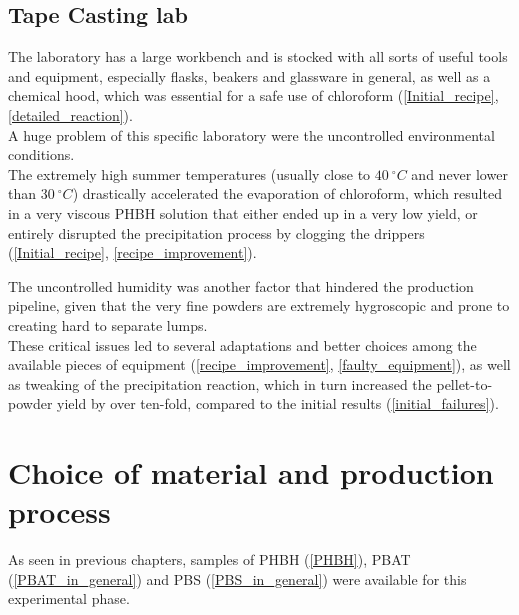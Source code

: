 \documentclass{article}
\begin{document}
        \subsection{Tape Casting lab\label{Tape_casting}}

        The laboratory has a large workbench and is stocked with all sorts of useful tools and equipment, especially flasks,
        beakers and glassware 
        in general, as well as a chemical hood, which was essential for a safe use of chloroform 
        (\ref{Initial_recipe}, \ref{detailed_reaction}). \\ 

        A huge problem of this specific laboratory were the uncontrolled environmental conditions. \\

        The extremely high summer temperatures (usually close to $40 \ ^{\circ} C$ and never lower than 
        $30 \ ^{\circ} C$) drastically accelerated the evaporation of chloroform, which resulted in a 
        very viscous PHBH solution that either ended up in a very low yield, or entirely disrupted the 
        precipitation process by clogging the drippers (\ref{Initial_recipe}, \ref{recipe_improvement}).

        The uncontrolled humidity was another factor that hindered the production pipeline, given that the very 
        fine powders are extremely hygroscopic and prone to creating hard to separate lumps. \\ 
        
        These critical issues led to several adaptations and better choices among the available pieces of
        equipment (\ref{recipe_improvement}, \ref{faulty_equipment}), as well as tweaking of the precipitation 
        reaction, which in turn increased the pellet-to-powder yield by over ten-fold, compared to the initial 
        results (\ref{initial_failures}).



    \clearpage
    \section{Choice of material and production process\label{Choice_material_process}}

    As seen in previous chapters, samples of PHBH (\ref{PHBH}), PBAT (\ref{PBAT_in_general}) and 
    PBS (\ref{PBS_in_general}) were available for this experimental phase. \\ 
\end{document}
